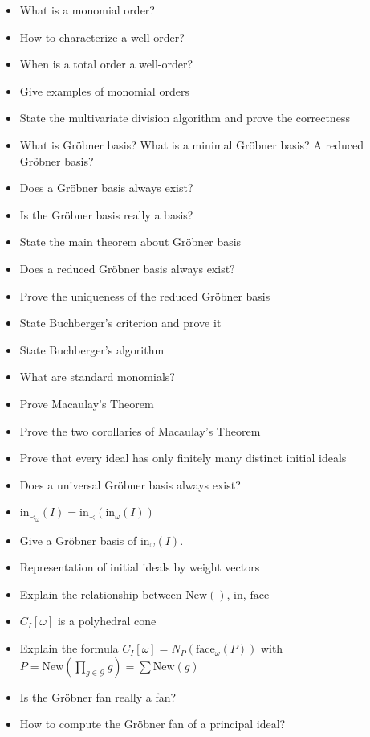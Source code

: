 \documentclass[a4paper, 11pt]{article}
\begin{document}
\begin{itemize}
  \item What is a monomial order?
  \item How to characterize a well-order?
  \item When is a total order a well-order?
  \item Give examples of monomial orders
  \item State the multivariate division algorithm and prove the correctness
  \item What is Gröbner basis? What is a minimal Gröbner basis? A reduced Gröbner basis?
  \item Does a Gröbner basis always exist?
  \item Is the Gröbner basis really a basis?
  \item State the main theorem about Gröbner basis
  \item Does a reduced Gröbner basis always exist?
  \item Prove the uniqueness of the reduced Gröbner basis 
  \item State Buchberger's criterion and prove it
  \item State Buchberger's algorithm
  \item What are standard monomials?
  \item Prove Macaulay's Theorem
  \item Prove the two corollaries of Macaulay's Theorem
  \item Prove that every ideal has only finitely many distinct initial ideals
  \item Does a universal Gröbner basis always exist?
  \item \(     \mathrm{in}_{\prec_\omega} (I) = \mathrm{in}_\prec(\mathrm{in}_\omega(I))  \)
  \item Give a Gröbner basis of \( \mathrm{in}_\omega(I) \).
  \item Representation of initial ideals by weight vectors
  \item Explain the relationship between \( \mathrm{New}() \), \( \mathrm{in} \), \( \mathrm{face} \)
  \item \( C_I[\omega] \) is a polyhedral cone
  \item Explain the formula \( C_I[\omega] = N_P(\mathrm{face}_\omega(P)) \) with \( P = \mathrm{New}(\prod_{g \in \mathcal{G}} g) = \sum \mathrm{New}(g) \)
  \item Is the Gröbner fan really a fan?
  \item How to compute the Gröbner fan of a principal ideal?

\end{itemize}
\end{document}
